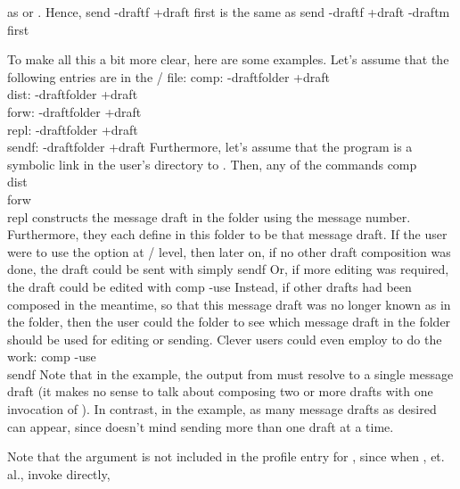 as  or .%
Hence,
\example send -draftf +draft first\endexample
is the same as
\example send -draftf +draft -draftm first\endexample
\par
To make all this a bit more clear, here are some examples.
Let's assume that the following entries are in the \profile/ file:
\example
    comp: -draftfolder +draft\\
    dist: -draftfolder +draft\\
    forw: -draftfolder +draft\\
    repl: -draftfolder +draft\\
    sendf: -draftfolder +draft%
\endexample
Furthermore,
let's assume that the program  is a symbolic link in the user's 
 directory to .
Then, any of the commands
\example
    comp\\
    dist\\
    forw\\
    repl%
\endexample
constructs the message draft in the  folder using the 
message number.
Furthermore,
they each define  in this folder to be that message draft.
If the user were to use the  option at \whatnow/ level,
then later on,
if no other draft composition was done,
the draft could be sent with simply
\example sendf\endexample
Or,
if more editing was required,
the draft could be edited with
\example comp -use\endexample
Instead,
if other drafts had been composed in the meantime,
so that this message draft was no longer known as  in the 
folder,
then the user could  the folder to see which message draft in the
folder should be used for editing or sending.
Clever users could even employ  to do the work:
\example
    comp -use \\
    sendf %
\endexample
Note that in the  example,
the output from  must resolve to a single message draft
(it makes no sense to talk about composing two or more drafts with one
invocation of ).
In contrast,
in the  example,
as many message drafts as desired can appear,
since  doesn't mind sending more than one draft at a time.
\par
Note that the argument  is not
included in the profile entry for ,
since when , et. al., invoke  directly,
